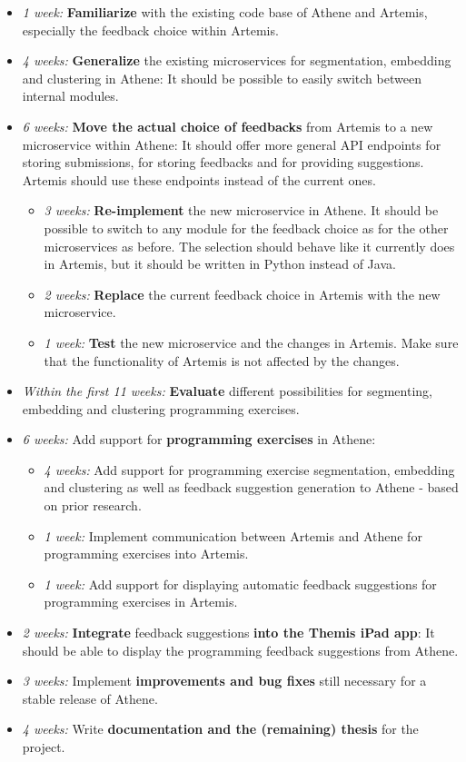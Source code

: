 \begin{itemize}
    \item \textit{1 week:} \textbf{Familiarize} with the existing code base of Athene and Artemis, especially the feedback choice within Artemis.
    \item \textit{4 weeks:} \textbf{Generalize} the existing microservices for segmentation, embedding and clustering in Athene: It should be possible to easily switch between internal modules.
    \item \textit{6 weeks:} \textbf{Move the actual choice of feedbacks} from Artemis to a new microservice within Athene: It should offer more general API endpoints for storing submissions, for storing feedbacks and for providing suggestions. Artemis should use these endpoints instead of the current ones.
    \begin{itemize}
        \item \textit{3 weeks:} \textbf{Re-implement} the new microservice in Athene. It should be possible to switch to any module for the feedback choice as for the other microservices as before. The selection should behave like it currently does in Artemis, but it should be written in Python instead of Java.
        \item \textit{2 weeks:} \textbf{Replace} the current feedback choice in Artemis with the new microservice.
        \item \textit{1 week:} \textbf{Test} the new microservice and the changes in Artemis. Make sure that the functionality of Artemis is not affected by the changes.
    \end{itemize}
    \item \textit{Within the first 11 weeks:} \textbf{Evaluate} different possibilities for segmenting, embedding and clustering programming exercises. %
    \item \textit{6 weeks:} Add support for \textbf{programming exercises} in Athene:
    \begin{itemize}
        \item \textit{4 weeks:} Add support for programming exercise segmentation, embedding and clustering as well as feedback suggestion generation to Athene - based on prior research.
        \item \textit{1 week:} Implement communication between Artemis and Athene for programming exercises into Artemis.
        \item \textit{1 week:} Add support for displaying automatic feedback suggestions for programming exercises in Artemis.
    \end{itemize}
    \item \textit{2 weeks:} \textbf{Integrate} feedback suggestions \textbf{into the Themis iPad app}: It should be able to display the programming feedback suggestions from Athene.
    \item \textit{3 weeks:} Implement \textbf{improvements and bug fixes} still necessary for a stable release of Athene.
    \item \textit{4 weeks:} Write \textbf{documentation and the (remaining) thesis} for the project.
\end{itemize}


\clearpage

\clearpage




